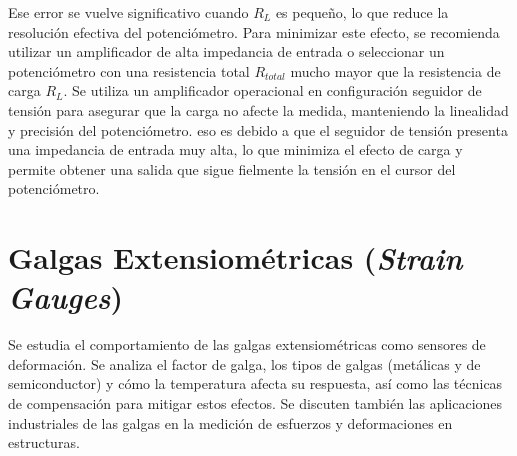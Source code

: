 \begin{marginfigure}[2em]
    \caption[Efecto de carga.]{Efecto de carga. El circuito (arriba) muestra la $R_L$ en paralelo con el brazo inferior. La gráfica (abajo) ilustra cómo la salida se \emph{aplasta} respecto a la ideal, perdiendo linealidad. El eje $y$ representa la relación $V_o/V_i$ y el eje $x$ la posición del cursor.}\label{fig:efecto_carga}
\end{marginfigure}

Ese error se vuelve significativo cuando $R_L$ es pequeño, lo que reduce la resolución efectiva del potenciómetro. Para minimizar este efecto, se recomienda utilizar un amplificador de alta impedancia de entrada o seleccionar un potenciómetro con una resistencia total $R_{total}$ mucho mayor que la resistencia de carga $R_L$. Se utiliza un amplificador operacional en configuración seguidor de tensión para asegurar que la carga no afecte la medida, manteniendo la linealidad y precisión del potenciómetro. eso es debido a que el seguidor de tensión presenta una impedancia de entrada muy alta, lo que minimiza el efecto de carga y permite obtener una salida que sigue fielmente la tensión en el cursor del potenciómetro.

\section{Galgas Extensiométricas (\textit{Strain Gauges})}\label{sec:galgas}

Se estudia el comportamiento de las galgas extensiométricas como sensores de deformación. Se analiza el factor de galga, los tipos de galgas (metálicas y de semiconductor) y cómo la temperatura afecta su respuesta, así como las técnicas de compensación para mitigar estos efectos. Se discuten también las aplicaciones industriales de las galgas en la medición de esfuerzos y deformaciones en estructuras.

